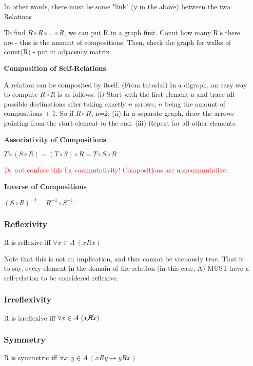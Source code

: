 \documentclass{article}
\begin{document}
In other words, there must be some "link" (y in the above) between the two Relations

\vspace{10pt}

To find $R \circ R \circ ... \circ R$, we can put R in a graph first. Count how many R's there are - this is the amount of compositions. Then, check the graph for walks of count(R) - put in adjacency matrix

\textbf{Composition of Self-Relations}

A relation can be composited by itself. (From tutorial) In a digraph, an easy way to compute $R \circ R$ is as follows. (i) Start with the first element $a$ and trace all possible destinations after taking exactly $n$ arrows, $n$ being the amount of compositions + 1. So if $R \circ R$, n=2. (ii) In a separate graph, draw the arrows pointing from the start element to the end. (iii) Repeat for all other elements.

\vspace{10pt}

\textbf{Associativity of Compositions}

$T \circ (S \circ R) = (T \circ S) \circ R = T \circ S \circ R$

\textcolor{red}{Do not confuse this for commutativity! Compositions are noncommutative.}

\vspace{10pt}

\textbf{Inverse of Compositions}

$(S \circ R)^{-1} = R^{-1} \circ S^{-1}$

\subsubsection{Reflexivity}
R is reflexive iff $\forall x \in A\ (xRx)$

\vspace{10pt}

Note that this is not an implication, and thus cannot be vacuously true. That is to say, every element in the domain of the relation (in this case, A) MUST have a self-relation to be considered reflexive.

\subsubsection{Irreflexivity}
R is irreflexive iff $\forall x \in A\ (x\cancel{R}x)$
\subsubsection{Symmetry}
R is symmetric iff $\forall x,y \in A\ (xRy \rightarrow yRx)$
\end{document}
